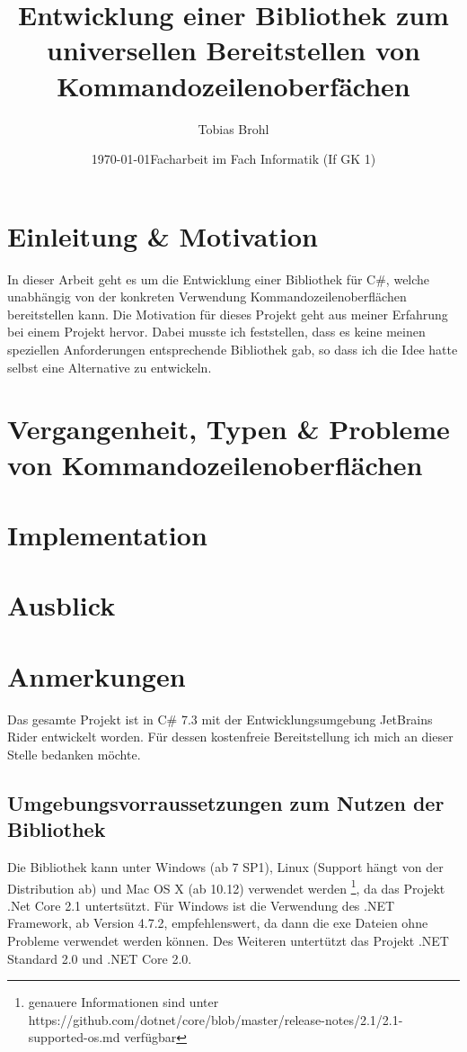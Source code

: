 \documentclass[a4paper,11pt,titlepage,ngerman]{article}
\title{Entwicklung einer Bibliothek zum universellen Bereitstellen von Kommandozeilenoberfächen}
\author{Tobias Brohl}
\date{\today \linebreak \linebreak Facharbeit im Fach Informatik (If GK 1)}
\begin{document}
 \begin{sloppypar}
  \maketitle
  \setcounter{tocdepth}{5}
  \setcounter{page}{0}
  \thispagestyle{empty}
  \tableofcontents
  \pagebreak
  \section{Einleitung \& Motivation}\label{sec:Intro}
  In dieser Arbeit geht es um die Entwicklung einer Bibliothek für C\#, welche unabhängig von der konkreten Verwendung Kommandozeilenoberflächen bereitstellen kann.
  Die Motivation für dieses Projekt geht aus meiner Erfahrung bei einem Projekt hervor.
  Dabei musste ich feststellen, dass es keine meinen speziellen Anforderungen entsprechende Bibliothek gab, 
  so dass ich die Idee hatte selbst eine Alternative zu entwickeln.
  \section{Vergangenheit, Typen \& Probleme von Kommandozeilenoberflächen}
  

  \section{Implementation}\label{sec:Content}
  

  \section{Ausblick}\label{sec:Future}
  

  \section{Anmerkungen}\label{sec:AdditionalNotes}
  Das gesamte Projekt ist in C\# 7.3 mit der Entwicklungsumgebung JetBrains Rider entwickelt worden.
  Für dessen kostenfreie Bereitstellung ich mich an dieser Stelle bedanken möchte.
  \subsection{Umgebungsvorraussetzungen zum Nutzen der Bibliothek}\label{subsec:SystemRequirements}
   Die Bibliothek kann unter Windows (ab 7 SP1), Linux (Support hängt von der Distribution ab) und Mac OS X (ab 10.12) verwendet werden
  \footnote{genauere Informationen sind unter https://github.com/dotnet/core/blob/master/release-notes/2.1/2.1-supported-os.md verfügbar}, 
  da das Projekt .Net Core 2.1 untertsützt.
  Für Windows ist die Verwendung des .NET Framework, ab Version 4.7.2, empfehlenswert, da dann die exe Dateien ohne Probleme verwendet werden können.
  Des Weiteren untertützt das Projekt .NET Standard 
2.0 und .NET Core 2.0.

\end{sloppypar}
\end{document}
